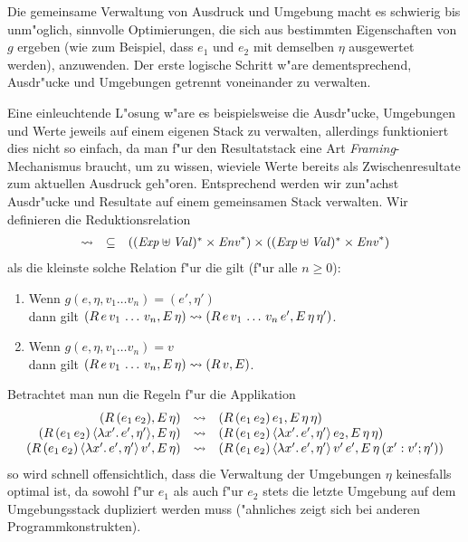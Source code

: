 \documentclass[12pt,a4paper,draft]{article}
\begin{document}
Die gemeinsame Verwaltung von Ausdruck und Umgebung macht es schwierig bis unm"oglich, sinnvolle Optimierungen,
die sich aus bestimmten Eigenschaften von $g$ ergeben (wie zum Beispiel, dass $e_1$ und $e_2$ mit demselben
$\eta$ ausgewertet werden), anzuwenden. Der erste logische Schritt w"are dementsprechend, Ausdr"ucke und
Umgebungen getrennt voneinander zu verwalten.

Eine einleuchtende L"osung w"are es beispielsweise die Ausdr"ucke, Umgebungen und Werte jeweils auf einem
eigenen Stack zu verwalten, allerdings funktioniert dies nicht so einfach, da man f"ur den Resultatstack eine
Art \emph{Framing}-Mechanismus braucht, um zu wissen, wieviele Werte bereits als Zwischenresultate zum
aktuellen Ausdruck geh"oren. Entsprechend werden wir zun"achst Ausdr"ucke und Resultate auf einem gemeinsamen
Stack verwalten. Wir definieren die Reduktionsrelation
\[\begin{array}{rcl}
  \rightsquigarrow & \subseteq & ((\mathit{Exp} \uplus \mathit{Val})^* \times \mathit{Env}^*) \times ((\mathit{Exp} \uplus \mathit{Val})^* \times \mathit{Env}^*)
\end{array}\]
als die kleinste solche Relation f"ur die gilt (f"ur alle $n \ge 0$):
\begin{enumerate}
\item Wenn $g(e,\eta,v_1 \ldots v_n) = (e',\eta')$ \\
  dann gilt $(R\,e\,v_1\,\ldots\,v_n,E\,\eta) \rightsquigarrow (R\,e\,v_1\,\ldots\,v_n\,e',E\,\eta\,\eta')$.
\item Wenn $g(e,\eta,v_1 \ldots v_n) = v$ \\
  dann gilt $(R\,e\,v_1\,\ldots\,v_n,E\,\eta) \rightsquigarrow (R\,v,E)$.
\end{enumerate}
Betrachtet man nun die Regeln f"ur die Applikation
\[\begin{array}{rcl}
  (R\,({e_1}\,{e_2}),E\,\eta)
  &\rightsquigarrow& (R\,({e_1}\,{e_2})\,e_1,E\,\eta\,\eta) \\
  (R\,({e_1}\,{e_2})\,\langle{\lambda{x'}.\,{e'}},{\eta'}\rangle,E\,\eta)
  &\rightsquigarrow& (R\,({e_1}\,{e_2})\,\langle{\lambda{x'}.\,{e'}},{\eta'}\rangle\,e_2,E\,\eta\,\eta) \\
  (R\,({e_1}\,{e_2})\,\langle{\lambda{x'}.\,{e'}},{\eta'}\rangle\,v',E\,\eta)
  &\rightsquigarrow& (R\,({e_1}\,{e_2})\,\langle{\lambda{x'}.\,{e'}},{\eta'}\rangle\,v'\,e',E\,\eta\,(x':v';\eta')) \\
\end{array}\]
so wird schnell offensichtlich, dass die Verwaltung der Umgebungen $\eta$ keinesfalls optimal ist,
da sowohl f"ur $e_1$ als auch f"ur $e_2$ stets die letzte Umgebung auf dem Umgebungsstack dupliziert
werden muss ("ahnliches zeigt sich bei anderen Programmkonstrukten).
\end{document}
